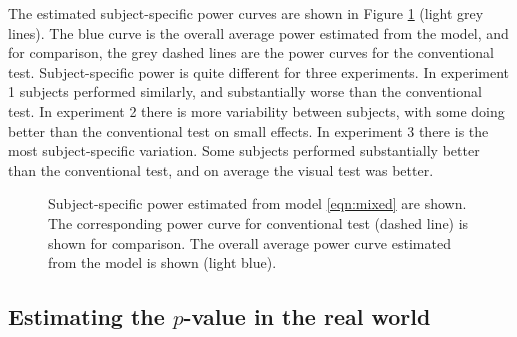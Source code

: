 \documentclass{article}
\newcommand{\blue}[1]{{\color{blue} #1}} %
\newcommand{\green}[1]{{\color{green} #1}} %
\begin{document}
 The estimated subject-specific power curves are shown in Figure \ref{fig:power_mixed_subject} (light grey lines). The blue curve is the overall average power estimated from the model, and for comparison, the grey dashed lines are the power curves for the conventional test. Subject-specific power is quite different for three experiments. In experiment 1 subjects performed similarly, and substantially worse than the conventional test. In experiment 2 there is more variability between subjects, with some doing better than the conventional test on small effects. In experiment 3 there is the most subject-specific variation. Some subjects performed substantially better than the conventional test, and on average the visual test was better. 

\begin{figure}[hbtp]
   \centering
       \caption{Subject-specific  power estimated from model \ref{eqn:mixed} are shown. The corresponding power curve for conventional test (dashed line) is shown for comparison. The overall average power curve estimated from the model is shown (light blue).}
       \label{fig:power_mixed_subject}
\end{figure}


\subsection{Estimating the $p$-value in the real world} 

\end{document}
